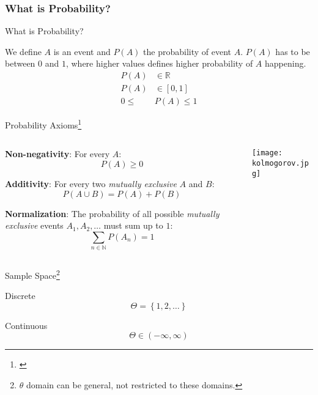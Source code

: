 \subsubsection{What is Probability?}
\begin{frame}{What is Probability?}
	\begin{defn}[Probability]
		We define $A$ is an event and $P(A)$ the probability of event $A$.
		$P(A)$ has to be between $0$ and $1$, where higher values defines
		higher probability of $A$ happening.
		$$
			\begin{aligned}
				P(A) & \in \mathbb{R} \\ P(A) & \in [0,1] \\ 0 \leq & P(A) \leq 1
			\end{aligned}
		$$
	\end{defn}
\end{frame}

\begin{frame}{Probability Axioms\footnote{\textcite{kolmogorovFoundationsTheoryProbability1933}}}
	\begin{columns}
		\begin{column}{0.8\textwidth}
			\begin{vfilleditems}
				\item \textbf{Non-negativity}: For every $A$: $$P(A) \geq 0$$ \vspace{-0.65cm} \item \textbf{Additivity}: For every two \textit{mutually exclusive} $A$ and $B$: $$P(A \cup B) = P(A) + P(B)$$ \vspace{-0.65cm} \item \textbf{Normalization}: The probability of all possible \textit{mutually exclusive} events $A_1, A_2, \dots$ must sum up to $1$: $$\sum_{n \in \mathbb{N}} P(A_n) = 1$$
			\end{vfilleditems}
		\end{column}
		\begin{column}{0.2\textwidth} \centering \texttt{[image: kolmogorov.jpg]}
		\end{column}
	\end{columns}
\end{frame}

\begin{frame}{Sample Space\footnote{$\theta$ domain can be general, not restricted to these domains.
		}}
	\begin{vfilleditems}
		\item Discrete $$\Theta = \left\{1, 2, \ldots \right\}$$
		\item Continuous $$\Theta \in \left(-\infty, \infty \right)$$
	\end{vfilleditems}
\end{frame}

